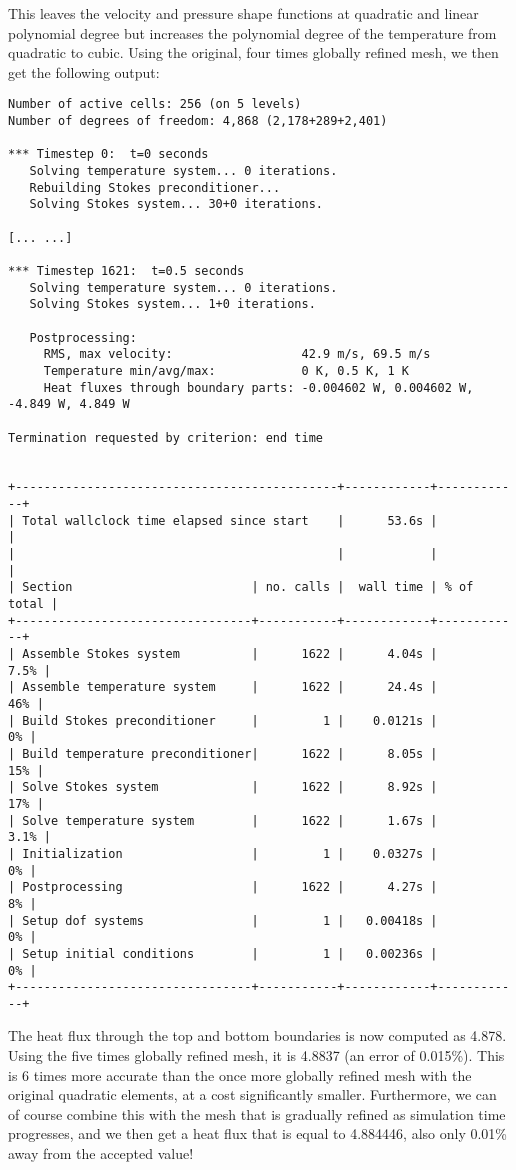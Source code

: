 \documentclass{article}
\begin{document}
This leaves the velocity and pressure shape functions at quadratic and linear
polynomial degree but increases the polynomial degree of the temperature from
quadratic to cubic. Using the original, four times globally refined mesh, we
then get the following output:
\begin{lstlisting}[frame=single,language=ksh]
Number of active cells: 256 (on 5 levels)
Number of degrees of freedom: 4,868 (2,178+289+2,401)

*** Timestep 0:  t=0 seconds
   Solving temperature system... 0 iterations.
   Rebuilding Stokes preconditioner...
   Solving Stokes system... 30+0 iterations.

[... ...]

*** Timestep 1621:  t=0.5 seconds
   Solving temperature system... 0 iterations.
   Solving Stokes system... 1+0 iterations.

   Postprocessing:
     RMS, max velocity:                  42.9 m/s, 69.5 m/s
     Temperature min/avg/max:            0 K, 0.5 K, 1 K
     Heat fluxes through boundary parts: -0.004602 W, 0.004602 W, -4.849 W, 4.849 W

Termination requested by criterion: end time


+---------------------------------------------+------------+------------+
| Total wallclock time elapsed since start    |      53.6s |            |
|                                             |            |            |
| Section                         | no. calls |  wall time | % of total |
+---------------------------------+-----------+------------+------------+
| Assemble Stokes system          |      1622 |      4.04s |       7.5% |
| Assemble temperature system     |      1622 |      24.4s |        46% |
| Build Stokes preconditioner     |         1 |    0.0121s |         0% |
| Build temperature preconditioner|      1622 |      8.05s |        15% |
| Solve Stokes system             |      1622 |      8.92s |        17% |
| Solve temperature system        |      1622 |      1.67s |       3.1% |
| Initialization                  |         1 |    0.0327s |         0% |
| Postprocessing                  |      1622 |      4.27s |         8% |
| Setup dof systems               |         1 |   0.00418s |         0% |
| Setup initial conditions        |         1 |   0.00236s |         0% |
+---------------------------------+-----------+------------+------------+

\end{lstlisting}

The heat flux through the top and bottom boundaries is now computed as 4.878.
Using the five times globally refined mesh, it is 4.8837 (an error of 0.015\%). 
This is 6 times more accurate than the 
once more globally refined mesh with the original quadratic elements, at a cost
significantly smaller. Furthermore, we can of course combine this with the mesh
that is gradually refined as simulation time progresses, and we then get a heat
flux that is equal to 4.884446, also only 0.01\% away from the accepted value!
\end{document}

